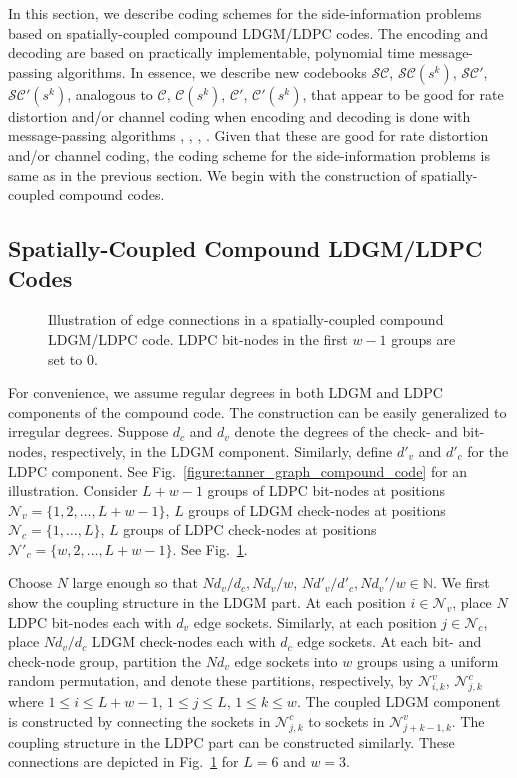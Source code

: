 \label{section:coupling_mp}
In this section, we describe coding schemes for the side-information problems based on spatially-coupled compound LDGM/LDPC codes.
The encoding and decoding are based on practically implementable, polynomial time message-passing algorithms.
In essence, we describe new codebooks $\mathcal{SC}$, $\mathcal{SC}(s^k)$, $\mathcal{SC}'$, $\mathcal{SC}'(s^k)$, analogous to $\mathcal{C}$, $\mathcal{C}(s^k)$, $\mathcal{C}'$, $\mathcal{C}'(s^k)$, that appear to be good for rate distortion and/or channel coding when encoding and decoding is done with message-passing algorithms  \cite{Aref-arxiv13}, \cite{Aref-isit12}, \cite{Obata-isit13}, \cite{Sakaniwa-arxiv11}.
Given that these are good for rate distortion and/or channel coding, the coding scheme for the side-information problems is same as in the previous section.
We begin with the construction of spatially-coupled compound codes.

\subsection{Spatially-Coupled Compound LDGM/LDPC Codes}
\begin{figure}[!tb]
  \centering
  \setlength\tikzheight{5cm}
  \setlength\tikzwidth{6cm} 
  
  \vspace{-2.5mm}
  \caption{Illustration of edge connections in a spatially-coupled compound LDGM/LDPC code.
    LDPC bit-nodes in the first $w-1$ groups are set to $0$.
  }
  \label{figure:protograph_coupled_compound}
\end{figure}
For convenience, we assume regular degrees in both LDGM and LDPC components of the compound code.
The construction can be easily generalized to irregular degrees.
Suppose $d_c$ and $d_v$ denote the degrees of the check- and bit-nodes, respectively, in the LDGM component.
Similarly, define $d'_v$ and $d'_c$ for the LDPC component.
See Fig.~\ref{figure:tanner_graph_compound_code} for an illustration.
Consider $L+w-1$ groups of LDPC bit-nodes at positions $\mathcal{N}_v=\{1,2,\ldots,L+w-1\}$, $L$ groups of LDGM check-nodes at positions $\mathcal{N}_c=\{1,\ldots,L\}$, $L$ groups of LDPC check-nodes at positions $\mathcal{N}'_c=\{w,2,\ldots,L+w-1\}$.
See Fig.~\ref{figure:protograph_coupled_compound}.

Choose $N$ large enough so that $N d_v/d_c, N d_v /w$, $N d'_v/d'_c, N d_v'/w \in \mathbb{N}$.
We first show the coupling structure in the LDGM part.
At each position $i \in \mathcal{N}_v$, place $N$ LDPC bit-nodes each with $d_v$ edge sockets.
Similarly, at each position $j \in \mathcal{N}_c$, place $N d_v/d_c$ LDGM check-nodes each with $d_c$ edge sockets.
At each bit- and check-node group, partition the $N d_v$ edge sockets into $w$ groups using a uniform random permutation, and denote these partitions, respectively, by $\mathcal{N}_{i,k}^v$, $\mathcal{N}^c_{j,k}$ where $1 \leq i \leq L+w-1$, $1 \leq j \leq L$, $1 \leq k \leq w$.
The coupled LDGM component is constructed by connecting the sockets in $\mathcal{N}^c_{j,k}$ to sockets in $\mathcal{N}^v_{j+k-1,k}$.
The coupling structure in the LDPC part can be constructed similarly.
These connections are depicted in Fig.~\ref{figure:protograph_coupled_compound} for $L=6$ and $w=3$.

